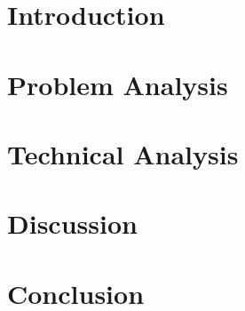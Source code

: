 \documentclass[11pt,twoside,titlepage]{report}
\begin{document}
\lhead[\fancyplain{}{\textit{\leftmark}}]{}
\rhead[]{\fancyplain{}{\textit{\leftmark}}}

\thispagestyle{empty}
\newpage
\cleardoublepage
\newpage
\thispagestyle{empty}


\newpage
\thispagestyle{empty}


\cleardoublepage
{}
\renewcommand{\thepage}{\arabic{page}}%
\thispagestyle{empty}
\tableofcontents
\printglossary[type=\acronymtype,nogroupskip,nonumberlist,title=Abbreviations]
\clearpage{\pagestyle{empty}\cleardoublepage}


\chapter{Introduction}
\label{sec:intro}

\chapter{Problem Analysis} \label{sec:problemanalysis}



\chapter{Technical Analysis}

\chapter{Discussion}

\chapter{Conclusion}
\end{document}
